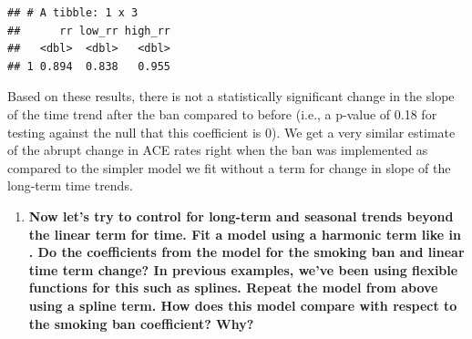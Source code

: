 \documentclass[
]{book}
\newenvironment{Shaded}{\begin{snugshade}}{\end{snugshade}}
\newcommand{\DataTypeTok}[1]{\textcolor[rgb]{0.13,0.29,0.53}{#1}}
\newcommand{\DecValTok}[1]{\textcolor[rgb]{0.00,0.00,0.81}{#1}}
\newcommand{\FloatTok}[1]{\textcolor[rgb]{0.00,0.00,0.81}{#1}}
\newcommand{\KeywordTok}[1]{\textcolor[rgb]{0.13,0.29,0.53}{\textbf{#1}}}
\newcommand{\NormalTok}[1]{#1}
\newcommand{\OperatorTok}[1]{\textcolor[rgb]{0.81,0.36,0.00}{\textbf{#1}}}
\newcommand{\StringTok}[1]{\textcolor[rgb]{0.31,0.60,0.02}{#1}}
\providecommand{\tightlist}{%
  \setlength{\itemsep}{0pt}\setlength{\parskip}{0pt}}
\begin{document}
\begin{Shaded}
\end{Shaded}

\begin{verbatim}
## # A tibble: 1 x 3
##      rr low_rr high_rr
##   <dbl>  <dbl>   <dbl>
## 1 0.894  0.838   0.955
\end{verbatim}

Based on these results, there is not a statistically significant change in the slope of the time trend after the ban compared to before (i.e., a p-value of 0.18 for testing against the null that this coefficient is 0). We get a very similar estimate of the abrupt change in ACE rates right when the ban was implemented as compared to the simpler model we fit without a term for change in slope of the long-term time trends.

\begin{enumerate}
\def\labelenumi{\arabic{enumi}.}
\setcounter{enumi}{3}
\tightlist
\item
  \textbf{Now let's try to control for long-term and seasonal trends beyond the linear term for time. Fit a model using a harmonic term like in \citet{bernal2017interrupted}. Do the coefficients from the model for the smoking ban and linear time term change? In previous examples, we've been using flexible functions for this such as splines. Repeat the model from above using a spline term. How does this model compare with respect to the smoking ban coefficient? Why?}
\end{enumerate}
\end{document}
